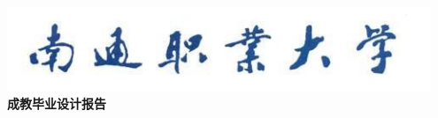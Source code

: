 \begin{titlepage}
\vspace{5em}
\begin{center}
\includegraphics[width=0.95\textwidth]{body/titlepage/title.jpg}\\\vspace{1.2em}
{
\textbf{\cukai \fontsize{40pt}{\baselineskip}\selectfont 成教毕业设计报告}
}
\end{center}
\par\vspace{10em}\fontsize{18pt}{\baselineskip}\selectfont 

\end{titlepage}
